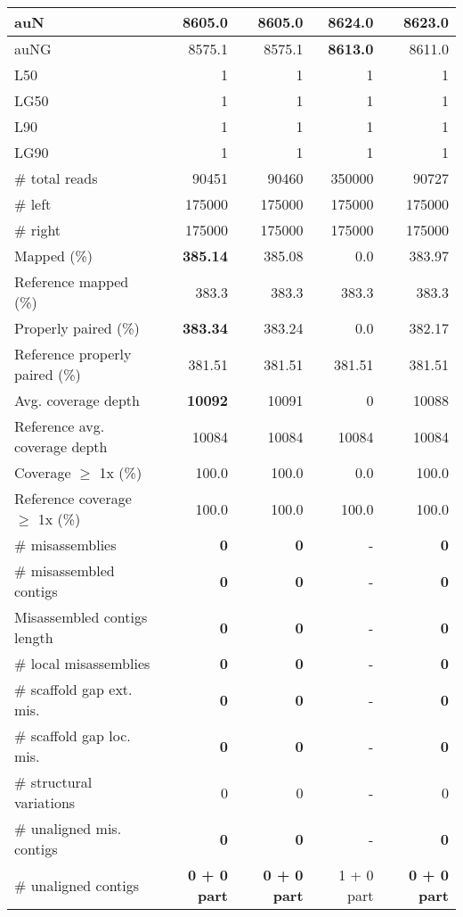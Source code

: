 \documentclass[12pt,a4paper]{article}
\begin{document}
\begin{table}[ht]
\begin{center}
\begin{tabular}{|l*{4}{|r}|}
auN & 8605.0 & 8605.0 & {\bf 8624.0} & 8623.0 \\ \hline
auNG & 8575.1 & 8575.1 & {\bf 8613.0} & 8611.0 \\ \hline
L50 & 1 & 1 & 1 & 1 \\ \hline
LG50 & 1 & 1 & 1 & 1 \\ \hline
L90 & 1 & 1 & 1 & 1 \\ \hline
LG90 & 1 & 1 & 1 & 1 \\ \hline
\# total reads & 90451 & 90460 & 350000 & 90727 \\ \hline
\# left & 175000 & 175000 & 175000 & 175000 \\ \hline
\# right & 175000 & 175000 & 175000 & 175000 \\ \hline
Mapped (\%) & {\bf 385.14} & 385.08 & 0.0 & 383.97 \\ \hline
Reference mapped (\%) & 383.3 & 383.3 & 383.3 & 383.3 \\ \hline
Properly paired (\%) & {\bf 383.34} & 383.24 & 0.0 & 382.17 \\ \hline
Reference properly paired (\%) & 381.51 & 381.51 & 381.51 & 381.51 \\ \hline
Avg. coverage depth & {\bf 10092} & 10091 & 0 & 10088 \\ \hline
Reference avg. coverage depth & 10084 & 10084 & 10084 & 10084 \\ \hline
Coverage $\geq$ 1x (\%) & 100.0 & 100.0 & 0.0 & 100.0 \\ \hline
Reference coverage $\geq$ 1x (\%) & 100.0 & 100.0 & 100.0 & 100.0 \\ \hline
\# misassemblies & {\bf 0} & {\bf 0} & - & {\bf 0} \\ \hline
\# misassembled contigs & {\bf 0} & {\bf 0} & - & {\bf 0} \\ \hline
Misassembled contigs length & {\bf 0} & {\bf 0} & - & {\bf 0} \\ \hline
\# local misassemblies & {\bf 0} & {\bf 0} & - & {\bf 0} \\ \hline
\# scaffold gap ext. mis. & {\bf 0} & {\bf 0} & - & {\bf 0} \\ \hline
\# scaffold gap loc. mis. & {\bf 0} & {\bf 0} & - & {\bf 0} \\ \hline
\# structural variations & 0 & 0 & - & 0 \\ \hline
\# unaligned mis. contigs & {\bf 0} & {\bf 0} & - & {\bf 0} \\ \hline
\# unaligned contigs & {\bf 0 + 0 part} & {\bf 0 + 0 part} & 1 + 0 part & {\bf 0 + 0 part} \\ \hline

\end{tabular}
\end{center}
\end{table}
\end{document}
